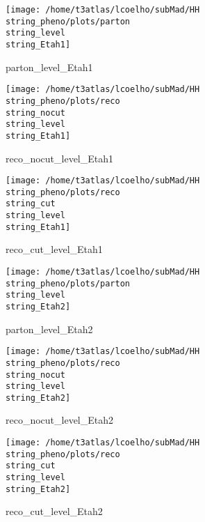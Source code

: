 \documentclass[a4paper,onecolumn,final,11pt]{article}
\begin{document}
\begin{figure}[H] 
\centering 
\begin{minipage}{.32\textwidth} 
        \centering 
        \hspace{0cm} 
        \texttt{[image: /home/t3atlas/lcoelho/subMad/HH\\string\_pheno/plots/parton\\string\_level\\string\_Etah1]} 
        \caption{parton_level_Etah1} 
\end{minipage} 
\hfill 
\begin{minipage}{.32\textwidth} 
        \centering 
        \hspace{0cm} 
    \texttt{[image: /home/t3atlas/lcoelho/subMad/HH\\string\_pheno/plots/reco\\string\_nocut\\string\_level\\string\_Etah1]} 
        \caption{reco_nocut_level_Etah1} 
\end{minipage} 
\hfill 
\begin{minipage}{.32\textwidth} 
        \centering 
        \hspace{0cm} 
    \texttt{[image: /home/t3atlas/lcoelho/subMad/HH\\string\_pheno/plots/reco\\string\_cut\\string\_level\\string\_Etah1]} 
        \caption{reco_cut_level_Etah1} 
\end{minipage} 
\end{figure} 
 
\begin{figure}[H] 
\centering 
\begin{minipage}{.32\textwidth} 
        \centering 
        \hspace{0cm} 
        \texttt{[image: /home/t3atlas/lcoelho/subMad/HH\\string\_pheno/plots/parton\\string\_level\\string\_Etah2]} 
        \caption{parton_level_Etah2} 
\end{minipage} 
\hfill 
\begin{minipage}{.32\textwidth} 
        \centering 
        \hspace{0cm} 
    \texttt{[image: /home/t3atlas/lcoelho/subMad/HH\\string\_pheno/plots/reco\\string\_nocut\\string\_level\\string\_Etah2]} 
        \caption{reco_nocut_level_Etah2} 
\end{minipage} 
\hfill 
\begin{minipage}{.32\textwidth} 
        \centering 
        \hspace{0cm} 
    \texttt{[image: /home/t3atlas/lcoelho/subMad/HH\\string\_pheno/plots/reco\\string\_cut\\string\_level\\string\_Etah2]} 
        \caption{reco_cut_level_Etah2} 
\end{minipage} 
\end{figure} 
 
\end{document}
